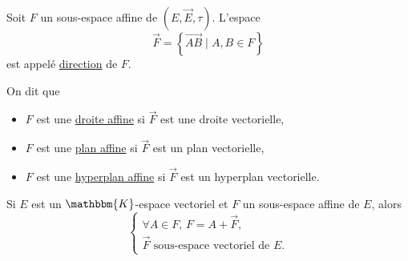 
\begin{defn}
	Soit $F$ un sous-espace affine de $\left( E, \vec{E}, \tau \right)$. L'espace \[
		\vec{F} = \left\{ \vec{AB}  \mid A,B \in F \right\}
	\] est appelé \underline{direction} de $F$.

	On dit que
	\begin{itemize}
		\item $F$ est une \underline{droite affine} si $\vec{F}$ est une droite vectorielle,
		\item $F$ est une \underline{plan affine} si $\vec{F}$ est un plan vectorielle,
		\item $F$ est une \underline{hyperplan affine} si $\vec{F}$ est un hyperplan vectorielle.
	\end{itemize}
\end{defn}

\begin{rmk}
	Si $E$ est un $\mathbbm{K}$-espace vectoriel et $F$ un sous-espace affine de $E$, alors \[
		\begin{cases}
			\forall A \in F,\, F = A + \vec{F},\\
			\vec{F} \text{ sous-espace vectoriel de } E.
		\end{cases}
	\]
\end{rmk}

